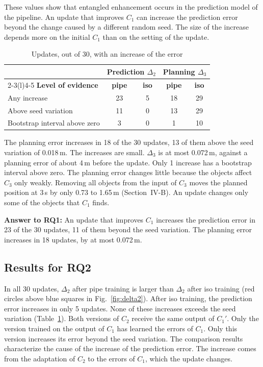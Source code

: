 \documentclass[conference]{IEEEtran}
\begin{document}
These values show that entangled enhancement occurs in the prediction model of the pipeline. An update that improves $C_1$ can increase the prediction error beyond the change caused by a different random seed. The size of the increase depends more on the initial $C_1$ than on the setting of the update.

\begin{table}[t]
\centering
\caption{Updates, out of 30, with an increase of the error}
\label{tab:counts}
\footnotesize
\setlength{\tabcolsep}{4pt}
\begin{tabular}{@{}lcccc@{}}
\toprule
& \multicolumn{2}{c}{\textbf{Prediction $\Delta_2$}} & \multicolumn{2}{c}{\textbf{Planning $\Delta_3$}} \\
\cmidrule(lr){2-3}\cmidrule(l){4-5}
\textbf{Level of evidence} & \textbf{pipe} & \textbf{iso} & \textbf{pipe} & \textbf{iso} \\
\midrule
Any increase & 23 & 5 & 18 & 29 \\
Above seed variation & 11 & 0 & 13 & 29 \\
Bootstrap interval above zero & 3 & 0 & 1 & 10 \\
\bottomrule
\end{tabular}
\end{table}

The planning error increases in 18 of the 30 updates, 13 of them above the seed variation of 0.018\,m. The increases are small. $\Delta_3$ is at most 0.072\,m, against a planning error of about 4\,m before the update. Only 1 increase has a bootstrap interval above zero. The planning error changes little because the objects affect $C_3$ only weakly. Removing all objects from the input of $C_3$ moves the planned position at 3\,s by only 0.73 to 1.65\,m (Section~IV-B). An update changes only some of the objects that $C_1$ finds.

\noindent\textbf{Answer to RQ1:} An update that improves $C_1$ increases the prediction error in 23 of the 30 updates, 11 of them beyond the seed variation. The planning error increases in 18 updates, by at most 0.072\,m.

\subsection{Results for RQ2}
In all 30 updates, $\Delta_2$ after pipe training is larger than $\Delta_2$ after iso training (red circles above blue squares in Fig.~\ref{fig:delta2}). After iso training, the prediction error increases in only 5 updates. None of these increases exceeds the seed variation (Table~\ref{tab:counts}). Both versions of $C_2$ receive the same output of $C_1'$. Only the version trained on the output of $C_1$ has learned the errors of $C_1$. Only this version increases its error beyond the seed variation. The comparison results characterize the cause of the increase of the prediction error. The increase comes from the adaptation of $C_2$ to the errors of $C_1$, which the update changes.
\end{document}
